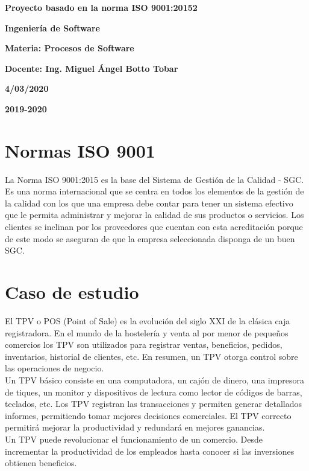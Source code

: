 \documentclass[12pt,a4paper]{article}
\begin{document}
{\begin{center}
{\Large\textbf{Proyecto basado en la norma ISO 9001:20152}
\par\vspace{1cm}
\Large\textbf{Ingenier\'ia de Software}
\par\vspace{1cm}
\Large\textbf{Materia: Procesos de Software}
\par\vspace{1cm}
\Large\textbf{Docente: Ing. Miguel \'Angel Botto Tobar }
}
\par\vspace{2cm}
\large\textbf{ 4/03/2020}
\par\vspace{0.5cm}
\large\textbf{2019-2020} 
\par\vspace{3cm} 

\end{center}
\clearpage
}

\tableofcontents
\par\vspace{12cm}

\section{Normas ISO 9001}\textbf{}
La Norma ISO 9001:2015 es la base del Sistema de Gestión de la Calidad - SGC. Es una norma internacional que se centra en todos los elementos de la gestión de la calidad con los que una empresa debe contar para tener un sistema efectivo que le permita administrar y mejorar la calidad de sus productos o servicios. 
Los clientes se inclinan por los proveedores que cuentan con esta acreditación porque de este modo se aseguran de que la empresa seleccionada disponga de un buen SGC.

\section{Caso de estudio}\textbf{}
El TPV o POS (Point of Sale) es la evolución del siglo XXI de la clásica caja registradora. En el mundo de la hostelería y venta al por menor de pequeños comercios los TPV son utilizados para registrar ventas, beneficios, pedidos, inventarios, historial de clientes, etc. En resumen, un TPV otorga control sobre las operaciones de negocio.\\
Un TPV básico consiste en una computadora, un cajón de dinero, una impresora de tiques, un monitor y dispositivos de lectura como lector de códigos de barras, teclados, etc. Los TPV registran las transacciones y permiten generar detallados informes, permitiendo tomar mejores decisiones comerciales. El TPV correcto permitirá mejorar la productividad y redundará en mejores ganancias.\\
Un TPV puede revolucionar el funcionamiento de un comercio. Desde incrementar la productividad de los empleados hasta conocer si las inversiones obtienen beneficios.\\\\
\end{document}
